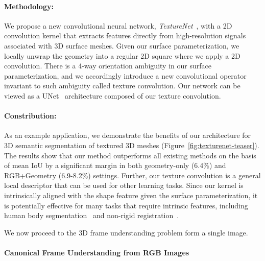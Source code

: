 \paragraph*{Methodology:} We propose a new convolutional neural network, \emph{TextureNet}~\cite{huang2018texturenet}, with a 2D convolution kernel that extracts features directly from high-resolution signals associated with 3D surface meshes.  Given our surface parameterization, we locally unwrap the geometry into a regular 2D square where we apply a 2D convolution. There is a 4-way orientation ambiguity in our surface parameterization, and we accordingly introduce a new convolutional operator invariant to such ambiguity called texture convolution. Our network can be viewed as a UNet~\cite{ronneberger2015u} architecture composed of our texture convolution.

\paragraph*{Constribution:} As an example application, we demonstrate the benefits of our architecture for 3D semantic segmentation of textured 3D meshes (Figure~\ref{fig:texturenet-teaser}).  The results show that our method outperforms all existing methods on the basis of mean IoU by a significant margin in both geometry-only (6.4\%) and RGB+Geometry (6.9-8.2\%) settings. Further, our texture convolution is a general local descriptor that can be used for other learning tasks. Since our kernel is intrinsically aligned with the shape feature given the surface parameterization, it is potentially effective for many tasks that require intrinsic features, including human body segmentation~\cite{maron2017convolutional} and non-rigid registration~\cite{litany2017deep}.

\vspace*{10pt}\noindent We now proceed to the 3D frame understanding problem form a single image.

\paragraph*{Canonical Frame Understanding from RGB Images}
\label{intro:frame}

